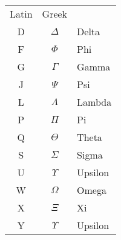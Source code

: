 \begin{center}
  \begin{tabular}{ccl}
    Latin & Greek \\[4pt]
    D & $\Delta$ & Delta \\
    F & $\Phi$ & Phi \\
    G & $\Gamma$ & Gamma \\
    J & $\Psi$ & Psi\\
    L & $\Lambda$ & Lambda \\
    P & $\Pi$ & Pi \\
    Q & $\Theta$ & Theta \\
    S & $\Sigma$ & Sigma \\
    U & $\Upsilon$ & Upsilon \\
    W & $\Omega$ & Omega \\
    X & $\Xi$  & Xi \\
    Y & $\Upsilon$ & Upsilon \\
  \end{tabular}
\end{center}
